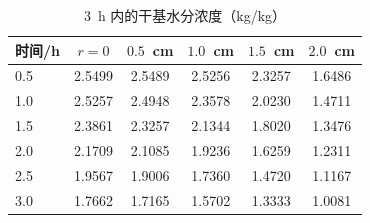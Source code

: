 \begin{table}[H]
  \centering
  \caption{$3$~h 内的干基水分浓度（kg/kg）}
  \label{tab:table4_q2_moisture}
  \small
  \begin{tabular}{lccccc}
    \toprule
    时间/h & $r=0$ & $0.5$~cm & $1.0$~cm & $1.5$~cm & $2.0$~cm \\
    \midrule
    0.5 & 2.5499 & 2.5489 & 2.5256 & 2.3257 & 1.6486 \\
    1.0 & 2.5257 & 2.4948 & 2.3578 & 2.0230 & 1.4711 \\
    1.5 & 2.3861 & 2.3257 & 2.1344 & 1.8020 & 1.3476 \\
    2.0 & 2.1709 & 2.1085 & 1.9236 & 1.6259 & 1.2311 \\
    2.5 & 1.9567 & 1.9006 & 1.7360 & 1.4720 & 1.1167 \\
    3.0 & 1.7662 & 1.7165 & 1.5702 & 1.3333 & 1.0081 \\
    \bottomrule
  \end{tabular}
\end{table}
